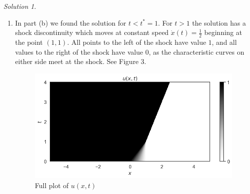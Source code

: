 \documentclass[12pt,a4paper]{article}
\theoremstyle{definition}
\theoremstyle{remark}
\newtheorem*{solution}{Solution}
\begin{document}
\begin{solution}
\begin{enumerate}[label=(\alph*)]
      \item In part (b) we found the solution for $t < t^*=1$. For $t > 1$ the solution has a shock discontinuity which moves at constant speed $\dot x(t) = \frac{1}{2}$ beginning at the point $(1,1)$. All points to the left of the shock have value $1$, and all values to the right of the shock have value $0$, as the characteristic curves on either side meet at the shock. See Figure 3. 
      
      \begin{figure}[h]
        \centering
        \includegraphics[width=\textwidth]{Fig3.png}
        \caption{Full plot of $u(x, t)$}
        \label{fig:fig3}
      \end{figure}  

    \end{enumerate}
  \end{solution}
  
\end{document}
